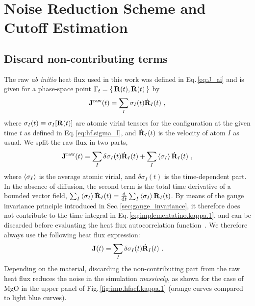 \section{Noise Reduction Scheme and Cutoff Estimation}
\subsection{Discard non-contributing terms}
The raw \emph{ab initio} heat flux used in this work was defined in Eq.\,\eqref{eq:J_ai} and is given for a phase-space point $\Gamma_t = \set{{\bf R} (t), \dot{\bf R} (t)}$ by
\begin{align}
	{\bf J}^{\rm raw} (t) = \sum_I \sigma_I (t)  \dot{\bf R}_I (t)~,
	\label{eq:imp.J.0}
\end{align}
where $\sigma_I (t) \equiv \sigma_I [{\bf R} (t)]$ are atomic virial tensors for the configuration at the given time $t$ as defined in Eq.\,\eqref{eq:hf.sigma_I}, and $\dot{\bf R}_I (t)$ is the velocity of atom $I$ as usual. We split the raw flux in two parts,
\begin{align}
	{\bf J}^{\rm raw} (t)
		= \sum_I \delta \sigma_I (t) \dot{\bf R}_I (t) 
		+ \sum_I \braket{\sigma_I} \dot{\bf R}_I (t)~,
	\label{eq:imp.J.1}
\end{align}
where $\braket{\sigma_I}$ is the average atomic virial, and $\delta \sigma_I (t)$ is the time-dependent part. In the absence of diffusion, the second term is the total time derivative of a bounded vector field, $\sum_I \braket{\sigma_I} \dot{\bf R}_I (t) = \frac{{\rm d}}{{\rm d} t} \sum_I \braket{\sigma_I} {\bf R}_I (t)$. By means of the gauge invariance principle introduced in Sec.\,\ref{sec:gauge_invariance}, it therefore does not contribute to the time integral in Eq.\,\eqref{eq:implementatino.kappa.1}, and can be discarded before evaluating the heat flux autocorrelation function~\cite{Ercole2016}. We therefore always use the following heat flux expression:
\begin{align}
	{\bf J} (t)
		= \sum_I \delta \sigma_I (t) \dot{\bf R}_I (t)~.
	\label{eq:imp.J}
\end{align}
Depending on the material, discarding the non-contributing part from the raw heat flux reduces the noise in the simulation \emph{massively}, as shown for the case of MgO in the upper panel of Fig.\,\ref{fig:imp.hfacf.kappa.1} (orange curves compared to light blue curves).
